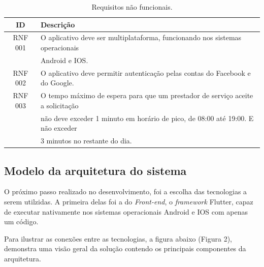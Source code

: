 \begin{table}[!ht]
  \begin{center}  
    \caption{Requisitos não funcionais.}
    \label{tab:table1}
    \begin{tabular}{|c|l|} 
      \hline
      \textbf{ID} & \textbf{Descrição}\\
      \hline
      RNF 001 & O aplicativo deve ser multiplataforma, funcionando             nos sistemas operacionais \\ 
              & Android e IOS. \\
      \hline
      RNF 002 & O aplicativo deve permitir autenticação pelas contas           do Facebook e do Google. \\
      \hline
      RNF 003 & O tempo máximo de espera para que um prestador de              serviço aceite a solicitação \\
              & não deve exceder 1                minuto em horário    de pico, de 08:00 até 19:00. E não           exceder \\
              & 3 minutos no restante do dia. \\
     \hline
    \end{tabular}
  \end{center}
\end{table}

\subsection{Modelo da arquitetura do sistema}

O próximo passo realizado no desenvolvimento, foi a escolha das tecnologias a serem utilzidas. A primeira delas foi a do \textit{Front-end}, o \textit{framework} Flutter, capaz de executar nativamente nos sistemas operacionais Android e IOS com apenas um código.

Para ilustrar as conexões entre as tecnologias, a figura abaixo (Figura 2), demonstra uma visão geral da solução contendo os principais componentes da arquitetura.

